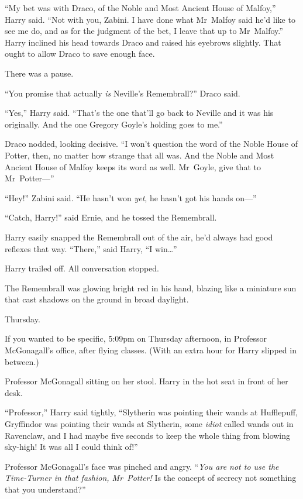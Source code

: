 “My bet was with Draco, of the Noble and Most Ancient House of Malfoy,” Harry said. “Not with you, Zabini. I have done what Mr~Malfoy said he’d like to see me do, and as for the judgment of the bet, I leave that up to Mr~Malfoy.” Harry inclined his head towards Draco and raised his eyebrows slightly. That ought to allow Draco to save enough face.

There was a pause.

“You promise that actually \emph{is} Neville’s Remembrall?” Draco said.

“Yes,” Harry said. “That’s the one that’ll go back to Neville and it was his originally. And the one Gregory Goyle’s holding goes to me.”

Draco nodded, looking decisive. “I won’t question the word of the Noble House of Potter, then, no matter how strange that all was. And the Noble and Most Ancient House of Malfoy keeps its word as well. Mr~Goyle, give that to Mr~Potter—”

“Hey!” Zabini said. “He hasn’t won \emph{yet}, he hasn’t got his hands on—”

“Catch, Harry!” said Ernie, and he tossed the Remembrall.

Harry easily snapped the Remembrall out of the air, he’d always had good reflexes that way. “There,” said Harry, “I win…”

Harry trailed off. All conversation stopped.

The Remembrall was glowing bright red in his hand, blazing like a miniature sun that cast shadows on the ground in broad daylight.

\later

Thursday.

If you wanted to be specific, 5:09pm on Thursday afternoon, in Professor McGonagall’s office, after flying classes. (With an extra hour for Harry slipped in between.)

Professor McGonagall sitting on her stool. Harry in the hot seat in front of her desk.

“Professor,” Harry said tightly, “Slytherin was pointing their wands at Hufflepuff, Gryffindor was pointing their wands at Slytherin, some \emph{idiot} called wands out in Ravenclaw, and I had maybe five seconds to keep the whole thing from blowing sky-high! It was all I could think of!”

Professor McGonagall’s face was pinched and angry. “\emph{You are not to use the Time-Turner in that fashion, Mr~Potter!} Is the concept of secrecy not something that you understand?”

